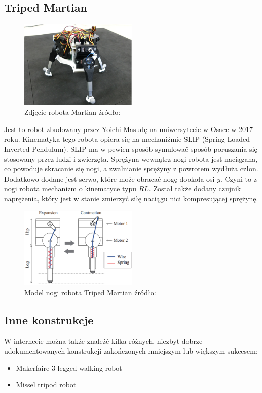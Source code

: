 \subsection{Triped Martian}
\begin{figure}[h!]
\centering
\includegraphics[width=0.5\textwidth]{img/martian_photo.png}
\caption{Zdjęcie robota Martian źródło: \cite{Triped_Martian}}
\label{martian_photo}
\end{figure}
Jest to robot zbudowany przez Yoichi Masudę na uniwersytecie w Osace w 2017 roku. Kinematyka tego robota opiera się na mechaniźmie SLIP (Spring-Loaded-Inverted Pendulum). SLIP ma w pewien sposób symulować sposób poruszania się stosowany przez ludzi i zwierzęta. Sprężyna wewnątrz nogi robota jest naciągana, co powoduje skracanie się nogi, a zwalnianie sprężyny z powrotem wydłuża człon. Dodatkowo dodane jest serwo, które może obracać nogę dookoła osi $y$. Czyni to z nogi robota mechanizm o kinematyce typu $RL$. Został także dodany czujnik naprężenia, który jest w stanie zmierzyć siłę naciągu nici kompresującej sprężynę. \cite{Triped_Martian}\\

\begin{figure}[h!]
\centering
\includegraphics[width=0.5\textwidth]{img/martian_model.png}
\caption{Model nogi robota Triped Martian źródło: \cite{Triped_Martian}}
\label{martian_leg}
\end{figure}

\subsection{Inne konstrukcje}
W internecie można także znaleźć kilka różnych, niezbyt dobrze udokumentowanych konstrukcji zakończonych mniejszym lub większym sukcesem:
\begin{itemize}[noitemsep]
\item Makerfaire 3-legged walking robot \cite{makerfaire_three_legged}%
\item Missel tripod robot \cite{Missel_tripod}%
\end{itemize}

